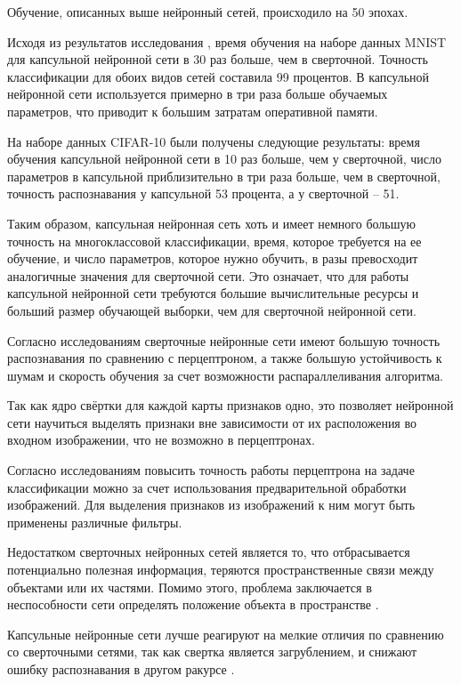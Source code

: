 Обучение, описанных выше нейронный сетей, происходило на 50 эпохах.

Исходя из результатов исследования \cite{comparising}, время обучения на наборе данных MNIST для капсульной нейронной сети в 30 раз больше, чем в сверточной. Точность классификации для обоих видов сетей составила 99 процентов. В капсульной нейронной сети используется примерно в три раза больше обучаемых параметров, что приводит к большим затратам оперативной памяти.

На наборе данных CIFAR-10 были получены следующие результаты: время обучения капсульной нейронной сети в 10 раз больше, чем у сверточной, число параметров в капсульной приблизительно в три раза больше, чем в сверточной, точность распознавания у капсульной 53 процента, а у сверточной -- 51.

Таким образом, капсульная нейронная сеть хоть и имеет немного большую точность на многоклассовой классификации, время, которое требуется на ее обучение, и число параметров, которое нужно обучить, в разы превосходит аналогичные значения для сверточной сети. Это означает, что для работы капсульной нейронной сети требуются большие вычислительные ресурсы и больший размер обучающей выборки, чем для сверточной нейронной сети.

Согласно исследованиям \cite{research1} сверточные нейронные сети имеют большую точность распознавания по сравнению с перцептроном, а также большую устойчивость к шумам и скорость обучения за счет возможности распараллеливания алгоритма.

Так как ядро свёртки для каждой карты признаков одно, это позволяет нейронной сети научиться выделять признаки вне зависимости от их расположения во входном изображении, что не возможно в перцептронах.

Согласно исследованиям \cite{perseptronprepare} повысить точность работы перцептрона на задаче классификации можно за счет использования предварительной обработки изображений. Для выделения признаков из изображений к ним могут быть применены различные фильтры.

Недостатком сверточных нейронных сетей является то, что отбрасывается потенциально полезная информация, теряются пространственные связи между объектами или их частями. Помимо этого, проблема заключается в неспособности сети определять положение объекта в пространстве \cite{capsule2}.

Капсульные нейронные сети лучше реагируют на мелкие отличия по сравнению со сверточными сетями, так как свертка является загрублением, и снижают ошибку распознавания в другом ракурсе \cite{galaxy}.

